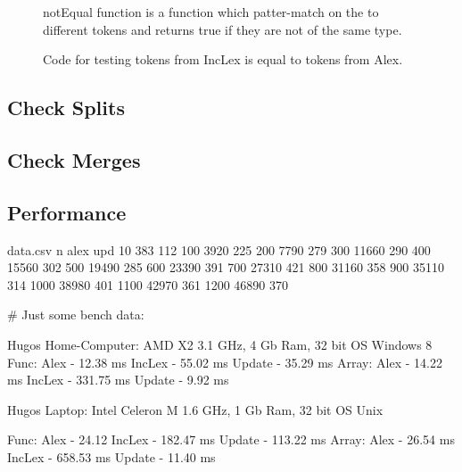\begin{figure}[h!]
  \centering
  
  notEqual function is a function which patter-match on the to different tokens and returns true if they are not of the same type.
  \caption{Code for testing tokens from IncLex is equal to tokens from Alex. 
  \label{fig:CheckEquility}}
\end{figure} 

\subsection{Check Splits}

\subsection{Check Merges} 

\subsection{Performance}
\begin{filecontents*}{data.csv}
n     alex   upd
10    383    112
100   3920   225
200   7790   279
300   11660  290
400   15560  302
500   19490  285
600   23390  391
700   27310  421
800   31160  358
900   35110  314
1000  38980  401
1100  42970  361
1200  46890  370
\end{filecontents*}




\# Just some bench data:

Hugos Home-Computer: AMD X2 3.1 GHz, 4 Gb Ram, 32 bit OS Windows 8
Func:
  Alex - 12.38 ms
  IncLex - 55.02 ms
  Update - 35.29 ms
Array:
  Alex - 14.22 ms
  IncLex - 331.75 ms
  Update - 9.92 ms

Hugos Laptop: Intel Celeron M 1.6 GHz, 1 Gb Ram, 32 bit OS Unix

Func:
  Alex - 24.12
  IncLex - 182.47 ms
  Update - 113.22 ms
Array:
  Alex - 26.54 ms
  IncLex - 658.53 ms
  Update - 11.40 ms

